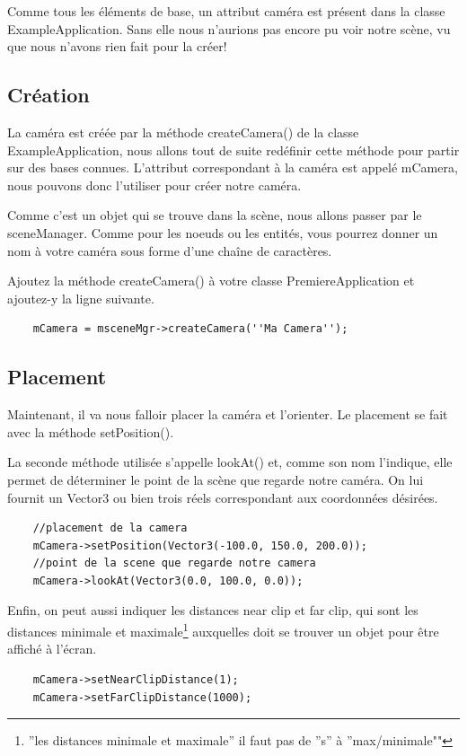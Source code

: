 \documentclass[10pt,a4paper]{report}
\begin{document}
Comme tous les \'el\'ements de base, un attribut cam\'era est pr\'esent dans la classe ExampleApplication. Sans elle nous n'aurions pas encore pu voir notre sc\`ene, vu que nous n'avons rien fait pour la cr\'eer!



\subsection{Cr\'eation}

La cam\'era est cr\'e\'ee par la m\'ethode  createCamera() de la classe ExampleApplication, nous allons tout de suite red\'efinir cette m\'ethode pour partir sur des bases connues. L'attribut correspondant \`{a} la cam\'era est appel\'e mCamera, nous pouvons donc l'utiliser pour cr\'eer notre cam\'era.

Comme c'est un objet qui se trouve dans la sc\`ene, nous allons passer par le sceneManager. Comme pour les noeuds ou les entit\'es, vous pourrez donner un nom \`{a} votre cam\'era sous forme d'une cha\^ine de caract\`eres.

Ajoutez la m\'ethode createCamera() \`{a} votre classe PremiereApplication et ajoutez-y la ligne suivante.

\begin{lstlisting}
	mCamera = msceneMgr->createCamera(''Ma Camera'');
\end{lstlisting}





\subsection{Placement}

Maintenant, il va nous falloir placer la cam\'era et l'orienter. Le placement se fait avec la m\'ethode setPosition(). 

La seconde m\'ethode utilis\'ee s'appelle lookAt() et, comme son nom l'indique, elle permet de d\'eterminer le point de la sc\`ene que regarde notre cam\'era. On lui fournit un Vector3 ou bien trois r\'eels correspondant aux coordonn\'ees d\'esir\'ees.

\begin{lstlisting}
	//placement de la camera
	mCamera->setPosition(Vector3(-100.0, 150.0, 200.0));
	//point de la scene que regarde notre camera
	mCamera->lookAt(Vector3(0.0, 100.0, 0.0));
\end{lstlisting}


Enfin, on peut aussi indiquer les distances near clip et far clip, qui sont les distances minimale et maximale\footnote{''les distances minimale et maximale'' il faut pas de ''s'' \`{a} ''max/minimale""} auxquelles doit se trouver un objet pour \^etre affich\'e \`{a} l'\'ecran.
\begin{lstlisting}
	mCamera->setNearClipDistance(1);
	mCamera->setFarClipDistance(1000);
\end{lstlisting}
\end{document}
